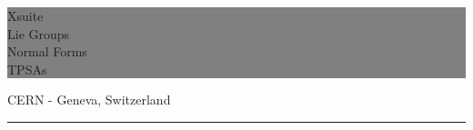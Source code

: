 \documentclass[a4paper,12pt]{book}
\newcommand{\HRule}[1]{\hfill \rule{0.2\linewidth}{#1}}
\begin{document}
\thispagestyle{empty} %


\noindent\colorbox{Gray}{
	\parbox[t]{\dimexpr\linewidth-4\fboxsep\relax}{
		\centering \fontsize{28pt}{40pt}\selectfont %
		\vspace*{0.7cm} %

		\hfill Xsuite \\[2em]
		\hfill Lie Groups \\
		\hfill Normal Forms \\
		\hfill TPSAs


		\vspace*{0.7cm} %
	}
}


                \vfill


{\centering \large
\hfill CERN - Geneva, Switzerland

\HRule{1pt}} %


\clearpage %

\newpage

\tableofcontents

\newpage


\renewcommand*{\arraystretch}{1.4}













\end{document}
